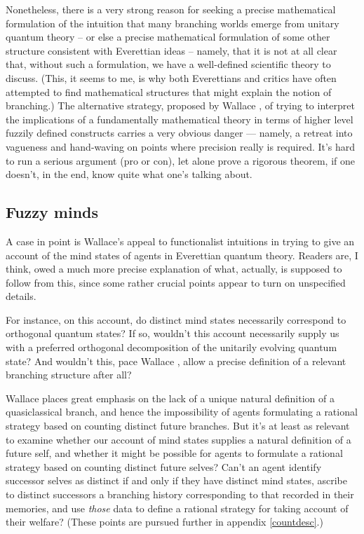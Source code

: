 \documentclass[aps,
pra,epsfig,12pt]{revtex4}
\begin{document}
Nonetheless, there is a very strong reason
for seeking \cite{akcritique} a precise mathematical
formulation of the intuition that many branching worlds emerge from 
unitary quantum theory -- or else a precise mathematical formulation
of some other structure consistent with Everettian ideas -- 
namely, that it is not at all clear that,
without such a formulation, we have a well-defined scientific theory
to discuss.   (This, it seems to me, is why both  
Everettians \cite{graham, deutschone} and
critics \cite{bellmw,almanyminds} have often attempted to find  
mathematical structures that might explain the notion of 
branching.)    The alternative 
strategy, proposed by Wallace \cite{wallacevolone}, of trying 
to interpret the implications of 
a fundamentally mathematical theory in terms of 
higher level fuzzily defined constructs carries a very obvious
danger --- namely, a retreat into vagueness and hand-waving on points where 
precision really is required.  
It's hard to run a serious argument (pro or con), let alone prove a 
rigorous theorem, if one doesn't, in the end, know quite what 
one's talking about.   

\subsection{Fuzzy minds}

A case in point is Wallace's appeal to functionalist intuitions in 
trying to give an account of the 
mind states of agents in Everettian quantum theory.
Readers are, I think, owed a much more precise explanation of what, actually, 
is supposed to follow from this, since
some rather crucial points appear to turn on unspecified details. 

For instance, on this account, do 
distinct mind states necessarily correspond to orthogonal quantum states?
If so, wouldn't this account necessarily supply us with a 
preferred orthogonal decomposition of the unitarily evolving 
quantum state?   And wouldn't this, pace Wallace \cite{wallacevolone}, 
allow a precise definition of a relevant branching structure after all?   

Wallace places great emphasis on the lack of a 
unique natural definition of a quasiclassical branch, and hence
the impossibility of agents formulating a rational strategy based
on counting distinct future branches.    
But it's at least as relevant to examine whether our account 
of mind states supplies a natural definition of a future self, and 
whether it might be possible for agents to formulate a rational 
strategy based on counting distinct future
selves?   Can't an agent identify successor selves as distinct if and 
only if they have distinct mind states, ascribe to distinct successors
a branching history corresponding to that recorded in their memories,
and use {\it those} data to define a rational strategy for taking account
of their welfare? (These points are pursued further in appendix
\ref{countdesc}.)  
\end{document}
